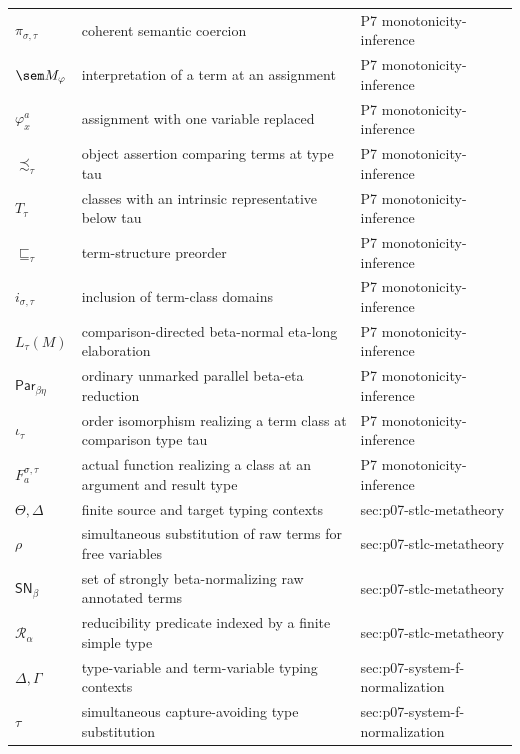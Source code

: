 \begin{longtable}{@{}p{}p{}p{}@{}}
\(\pi_{\sigma,\tau}\) & coherent semantic coercion & P7 monotonicity-\allowbreak{}inference \\
\(\sem M_\varphi\) & interpretation of a term at an assignment & P7 monotonicity-\allowbreak{}inference \\
\(\varphi_x^a\) & assignment with one variable replaced & P7 monotonicity-\allowbreak{}inference \\
\(\precsim_\tau\) & object assertion comparing terms at type tau & P7 monotonicity-\allowbreak{}inference \\
\(T_\tau\) & classes with an intrinsic representative below tau & P7 monotonicity-\allowbreak{}inference \\
\(\sqsubseteq_\tau\) & term-structure preorder & P7 monotonicity-\allowbreak{}inference \\
\(i_{\sigma,\tau}\) & inclusion of term-class domains & P7 monotonicity-\allowbreak{}inference \\
\(L_\tau(M)\) & comparison-directed beta-normal eta-long elaboration & P7 monotonicity-\allowbreak{}inference \\
\(\mathsf{Par}_{\beta\eta}\) & ordinary unmarked parallel beta-eta reduction & P7 monotonicity-\allowbreak{}inference \\
\(\iota_\tau\) & order isomorphism realizing a term class at comparison type tau & P7 monotonicity-\allowbreak{}inference \\
\(F_a^{\sigma,\tau}\) & actual function realizing a class at an argument and result type & P7 monotonicity-\allowbreak{}inference \\
\(\Theta,\allowbreak \Delta\) & finite source and target typing contexts & sec:\allowbreak{}p07-\allowbreak{}stlc-\allowbreak{}metatheory \\
\(\rho\) & simultaneous substitution of raw terms for free variables & sec:\allowbreak{}p07-\allowbreak{}stlc-\allowbreak{}metatheory \\
\(\mathsf{SN}_\beta\) & set of strongly beta-normalizing raw annotated terms & sec:\allowbreak{}p07-\allowbreak{}stlc-\allowbreak{}metatheory \\
\(\mathcal R_\alpha\) & reducibility predicate indexed by a finite simple type & sec:\allowbreak{}p07-\allowbreak{}stlc-\allowbreak{}metatheory \\
\(\Delta,\allowbreak \Gamma\) & type-variable and term-variable typing contexts & sec:\allowbreak{}p07-\allowbreak{}system-\allowbreak{}f-\allowbreak{}normalization \\
\(\tau\) & simultaneous capture-avoiding type substitution & sec:\allowbreak{}p07-\allowbreak{}system-\allowbreak{}f-\allowbreak{}normalization \\

\end{longtable}
